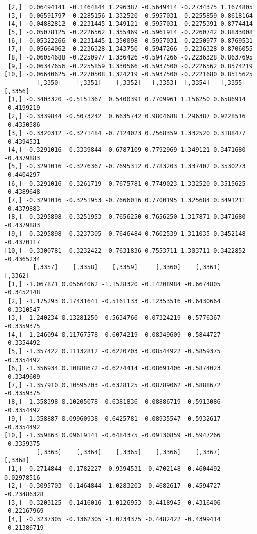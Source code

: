 \documentclass[
  letterpaper,
  DIV=11,
  numbers=noendperiod]{scrreprt}
\begin{document}
\begin{verbatim}
 [2,]  0.06494141 -0.1464844 1.296387 -0.5649414 -0.2734375 1.1674805
 [3,] -0.06591797 -0.2285156 1.332520 -0.5957031 -0.2255859 0.8618164
 [4,] -0.04882812 -0.2231445 1.349121 -0.5957031 -0.2275391 0.8774414
 [5,] -0.05078125 -0.2226562 1.355469 -0.5961914 -0.2260742 0.8833008
 [6,] -0.05322266 -0.2231445 1.350098 -0.5957031 -0.2250977 0.8769531
 [7,] -0.05664062 -0.2236328 1.343750 -0.5947266 -0.2236328 0.8706055
 [8,] -0.06054688 -0.2250977 1.336426 -0.5947266 -0.2236328 0.8637695
 [9,] -0.06347656 -0.2255859 1.330566 -0.5937500 -0.2226562 0.8574219
[10,] -0.06640625 -0.2270508 1.324219 -0.5937500 -0.2221680 0.8515625
         [,3350]    [,3351]    [,3352]   [,3353]  [,3354]   [,3355]    [,3356]
 [1,] -0.3403320 -0.5151367  0.5400391 0.7709961 1.156250 0.6586914 -0.4199219
 [2,] -0.3339844 -0.5073242  0.6635742 0.9804688 1.296387 0.9228516 -0.4350586
 [3,] -0.3320312 -0.3271484 -0.7124023 0.7568359 1.332520 0.3188477 -0.4394531
 [4,] -0.3291016 -0.3339844 -0.6787109 0.7792969 1.349121 0.3471680 -0.4379883
 [5,] -0.3291016 -0.3276367 -0.7695312 0.7783203 1.337402 0.3530273 -0.4404297
 [6,] -0.3291016 -0.3261719 -0.7675781 0.7749023 1.332520 0.3515625 -0.4389648
 [7,] -0.3291016 -0.3251953 -0.7666016 0.7700195 1.325684 0.3491211 -0.4379883
 [8,] -0.3295898 -0.3251953 -0.7656250 0.7656250 1.317871 0.3471680 -0.4379883
 [9,] -0.3295898 -0.3237305 -0.7646484 0.7602539 1.311035 0.3452148 -0.4370117
[10,] -0.3300781 -0.3232422 -0.7631836 0.7553711 1.303711 0.3422852 -0.4365234
        [,3357]    [,3358]    [,3359]     [,3360]    [,3361]    [,3362]
 [1,] -1.067871 0.05664062 -1.1528320 -0.14208984 -0.6674805 -0.3452148
 [2,] -1.175293 0.17431641 -0.5161133 -0.12353516 -0.6430664 -0.3310547
 [3,] -1.240234 0.13281250 -0.5634766 -0.07324219 -0.5776367 -0.3359375
 [4,] -1.246094 0.11767578 -0.6074219 -0.08349609 -0.5844727 -0.3354492
 [5,] -1.357422 0.11132812 -0.6220703 -0.08544922 -0.5859375 -0.3354492
 [6,] -1.356934 0.10888672 -0.6274414 -0.08691406 -0.5874023 -0.3349609
 [7,] -1.357910 0.10595703 -0.6328125 -0.08789062 -0.5888672 -0.3359375
 [8,] -1.358398 0.10205078 -0.6381836 -0.08886719 -0.5913086 -0.3354492
 [9,] -1.358887 0.09960938 -0.6425781 -0.08935547 -0.5932617 -0.3354492
[10,] -1.359863 0.09619141 -0.6484375 -0.09130859 -0.5947266 -0.3359375
         [,3363]    [,3364]    [,3365]    [,3366]    [,3367]     [,3368]
 [1,] -0.2714844 -0.1782227 -0.9394531 -0.4702148 -0.4604492  0.02978516
 [2,] -0.3095703 -0.1464844 -1.0283203 -0.4682617 -0.4594727 -0.23486328
 [3,] -0.3203125 -0.1416016 -1.0126953 -0.4418945 -0.4316406 -0.22167969
 [4,] -0.3237305 -0.1362305 -1.0234375 -0.4482422 -0.4399414 -0.21386719

\end{verbatim}
\end{document}
